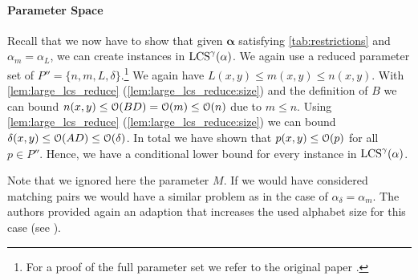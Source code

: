 






\paragraph*{Parameter Space}
Recall that we now have to show that given $\mathbf{\alpha}$ satisfying \autoref{tab:restrictions} and $\alpha_m = \alpha_L$, we can create instances in $\text{LCS}^\gamma(\mathbf{\alpha})$.
We again use a reduced parameter set of $P'' = \{n, m, L, \delta\}$.\footnote{For a proof of the full parameter set we refer to the original paper \cite[section 9.2.2]{Bringman.2018}.}
We again have $L(x,y) \leq m(x,y) \leq n(x,y)$.
With \autoref{lem:large_lcs_reduce} (\ref{lem:large_lcs_reduce:size}) and the definition of $B$ we can bound $n(x,y) \leq \mathcal{O}(BD) = \mathcal{O}(m) \leq \mathcal{O}(n)$ due to $m \leq n$.
Using \autoref{lem:large_lcs_reduce} (\ref{lem:large_lcs_reduce:size}) we can bound $\delta(x,y) \leq \mathcal{O}(AD) \leq \mathcal{O}(\delta)$.
%
In total we have shown that $p(x,y) \leq \mathcal{O}(p)$ for all $p \in P''$.
Hence, we have a conditional lower bound for every instance in $\text{LCS}^\gamma(\mathbb{\alpha})$. %

Note that we ignored here the parameter $M$.
If we would have considered matching pairs we would have a similar problem as in the case of $\alpha_\delta = \alpha_m$.
The authors provided again an adaption that increases the used alphabet size for this case (see \cite[Section 9.2.3]{Bringman.2018}).